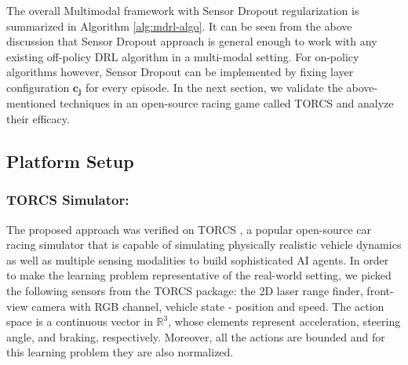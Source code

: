 \documentclass[../thesis.tex]{subfiles}
\begin{document}
The overall Multimodal framework with Sensor Dropout regularization is summarized in Algorithm \ref{alg:mdrl-algo}. It can be seen from the above discussion that Sensor Dropout approach is general enough to work with any existing off-policy DRL algorithm in a multi-modal setting. For on-policy algorithms however, Sensor Dropout can be implemented by fixing layer configuration $\mathbf{c_j}$ for every episode. In the next section, we validate the above-mentioned techniques in an open-source racing game called TORCS \cite{wymann2000torcs} and analyze their efficacy.


\subsection{Platform Setup} \label{sec:platform}
\subsubsection{TORCS Simulator:}
The proposed approach was verified on TORCS \cite{wymann2000torcs}, a popular open-source car racing simulator that is capable of simulating physically realistic vehicle dynamics as well as multiple sensing modalities \cite{GymTORCS} to build sophisticated AI agents. In order to make the learning problem representative of the real-world setting, we picked the following sensors from the TORCS package: the 2D laser range finder, front-view camera with RGB channel, vehicle state - position and speed. %
The action space is a continuous vector in $\mathbb{R}^3$, whose elements represent acceleration, steering angle, and braking, respectively. Moreover, all the actions are bounded and for this learning problem they are also normalized.
\end{document}

